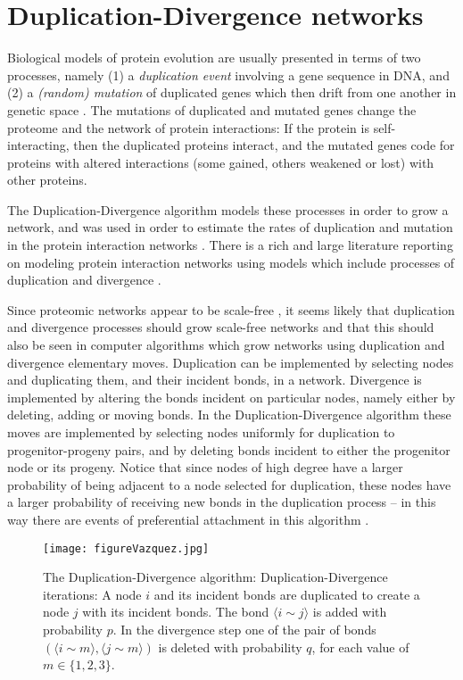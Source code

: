 \documentclass[12pt]{iopart}
\def\edge#1#2{{\langle #1{\sim}#2 \rangle}}
\begin{document}
\section{Duplication-Divergence networks}

Biological models of protein evolution are usually presented in terms of two
processes, namely (1) a \textit{duplication event} involving a gene sequence in DNA, 
and (2) a \textit{(random) mutation} of duplicated genes which then drift
from one another in genetic space \cite{W03,BLW04,HZ05}.   The mutations of
duplicated and mutated genes change the proteome and the network of protein
interactions:  If the protein is self-interacting, then the duplicated proteins interact,
and the mutated genes code for proteins with altered interactions (some gained,
others weakened or lost) with other proteins. 

The Duplication-Divergence algorithm models these processes in order to grow a
network, and was used in order to estimate the rates of duplication and mutation
in the protein interaction networks \cite{VF02}.  There is a rich and large 
literature reporting on modeling protein interaction networks using models
which include processes of duplication and divergence \cite{EI08,KBL04,TD11,NSRA12}.

Since proteomic networks appear to be scale-free \cite{E06,KW06}, it seems likely that
duplication and divergence processes should grow scale-free networks and that this
should also be seen in computer algorithms which grow networks using
duplication and divergence elementary moves.  Duplication can be implemented by
selecting nodes and duplicating them, and their incident bonds, in a network.
Divergence is implemented by altering the bonds incident on particular nodes,
namely either by deleting, adding or moving bonds.  In the Duplication-Divergence
algorithm these moves are implemented by selecting  nodes uniformly for duplication
to progenitor-progeny pairs, 
and by deleting bonds incident to either the progenitor node or its progeny. 
Notice that since nodes of high degree have a larger probability of being adjacent
to a node selected for duplication, these nodes have a larger probability of 
receiving new bonds in the duplication process -- in this way there are events
of preferential attachment in this algorithm \cite{EL03,PS03}.


\begin{figure}[t!]
 \centering
\texttt{[image: figureVazquez.jpg]}
  \caption{{The Duplication-Divergence algorithm:}
Duplication-Divergence iterations:  A node $i$ and its incident bonds are duplicated to 
create a node $j$ with its incident bonds.  The bond
$\langle{i}{\sim}{j}\rangle$ is added with probability $p$.  In the divergence
step one of the pair of bonds $(\edge{i}{m},\edge{j}{m})$ is deleted with
probability $q$, for each value of $m\in\{1,2,3\}$.}
\label{figure5DD}
\end{figure}
\end{document}
